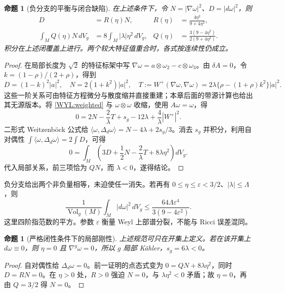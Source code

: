 \documentclass[UTF8,fontset=fandol,zihao=-4,oneside,openany]{ctexbook}
\theoremstyle{cjkplain}
\newtheorem{proposition}[theorem]{命题}
\numberwithin{equation}{chapter}
\DeclareMathOperator{\Vol}{Vol}
\begin{document}
\begin{proposition}[负分支的平衡与闭合缺陷]\label{WYL:balance}
在上述条件下，令 $N=|\nabla\omega|^2$、$D=|d\omega|^2$，则
\begin{align}
D&=R(\eta)N,& R(\eta)&=\frac{4\eta^2}{9+4\eta^2},\label{WYL:closure}\\
\int_M Q(\eta)N\,dV_g&=8\int_M|\lambda|\eta^2\,dV_g,
&Q(\eta)&=\frac{3(9-4\eta^2)}{2(9+4\eta^2)}.\label{WYL:balanceeq}
\end{align}
积分在上述闭覆盖上进行。两个较大特征值重合时，各式按连续性仍成立。
\end{proposition}
\begin{proof}
在局部长度为 $\sqrt2$ 的特征标架中写
$\nabla\omega=a\otimes\omega_2-c\otimes\omega_3$。由 $\delta A=0$，令 $k=(1-\rho)/(2+\rho)$，得到
\[
D=(1-k)^2|a|^2,\quad N=2(1+k^2)|a|^2,
\quad T:=W^+(\nabla\omega,\nabla\omega)
=2\lambda\{\rho-(1+\rho)k^2\}|a|^2.
\]
这些一阶关系可由特征方程微分与散度缩并直接重建；本章后面的带源计算也给出其无源版本。将 \eqref{WYL:weighted} 与 $\omega\otimes\omega$ 收缩，使用 $A\omega=\omega$，得
\[
0=2N-\frac2\lambda T+s_g-12\lambda+\frac4\lambda|W^+|^2.
\]
二形式 Weitzenböck 公式给
$\langle\omega,\Delta_d\omega\rangle=N-4\lambda+2s_g/3$。消去 $s_g$ 并积分，利用自对偶性
$\int\langle\omega,\Delta_d\omega\rangle=2\int D$，可得
\[
0=\int_M\left(3D+\frac12N-\frac2\lambda T+8\lambda\eta^2\right)dV_g.
\]
代入局部关系，前三项恰为 $QN$，而 $\lambda<0$，遂得结论。
\end{proof}

负分支给出两个非负量相等，未迫使任一消失。若再有
$0\le\eta\le\varepsilon<3/2$、$|\lambda|\le\Lambda$，则
\begin{equation}\label{WYL:quartic}
\frac1{\Vol_g(M)}\int_M|d\omega|^2\,dV_g
\le\frac{64\Lambda\varepsilon^4}{3(9-4\varepsilon^2)}.
\end{equation}
这里四阶指范数的平方。参数 $\varepsilon$ 衡量 Weyl 上部谱分裂，不能与 Ricci 误差混同。

\begin{proposition}[严格闭性条件下的局部刚性]\label{WYL:closed}
上述规范可只在开集上定义。若在该开集上 $d\omega\equiv0$，则 $\eta=0$ 且 $\nabla^g\omega=0$，所以 $g$ 局部 Kähler，$s_g=6\lambda<0$。
\end{proposition}
\begin{proof}
自对偶性给 $\Delta_d\omega=0$。前一证明的点态式变为
$0=QN+8\lambda\eta^2$，同时 $D=RN=0$。在 $\eta>0$ 处，$R>0$ 强迫 $N=0$，与 $\lambda\eta^2<0$ 矛盾；故 $\eta=0$，再由 $Q=3/2$ 得 $N=0$。
\end{proof}
\end{document}
